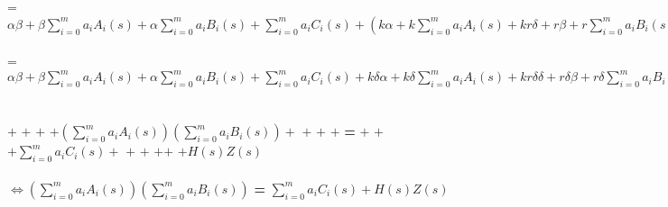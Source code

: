 \\
\\ = $\alpha \beta + \beta \sum_{i=0}^{m} a_i A_i (s) + \alpha \sum_{i=0}^{m} a_i B_i(s) + \sum_{i=0}^{m} a_i C_i(s) + (k \alpha + k \sum_{i=0}^{m} a_i A_i (s) + k r\delta + r \beta + r \sum_{i=0}^{m} a_i B_i (s) + r k\delta - rk\delta) \delta + H(s)Z(s)$
\\
\\ = $\alpha\beta + \beta\sum_{i=0}^{m} a_i A_i (s) + \alpha\sum_{i=0}^{m} a_i B_i(s) + \sum_{i=0}^{m} a_i C_i(s) + k\delta\alpha + k\delta\sum_{i=0}^{m} a_i A_i (s) + kr\delta\delta + r\delta\beta + r\delta\sum_{i=0}^{m} a_i B_i (s) + H(s)Z(s)$
\\
\\
\\ \texthl{$\alpha\beta$} $ + $  $ + $  $ + $  $+ (\sum_{i=0}^{m} a_i A_i (s))(\sum_{i=0}^{m} a_i B_i (s)) + $  $+ $  $ + $  $+ $  \textbf{\large=} \texthl{$\alpha\beta$} $ + $  $ + $  $ + \sum_{i=0}^{m} a_i C_i(s) + $  $ + $ $ + $  $+ $$ + $ $ + H(s)Z(s)$
\\
\\ $\Leftrightarrow (\sum_{i=0}^{m} a_i A_i (s))(\sum_{i=0}^{m} a_i B_i (s))$ \textbf{\large=} $\sum_{i=0}^{m} a_i C_i(s) + H(s)Z(s)$